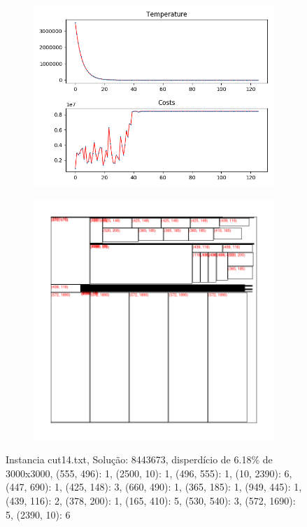 \begin{figure}
\centering
\begin{subfigure}{.5\textwidth}
  \centering
  \includegraphics[width=1\linewidth]{results/cut14/2/plot}
  \label{fig:sub1}
\end{subfigure}%
\begin{subfigure}{.5\textwidth}
  \centering
  \includegraphics[width=1\linewidth]{results/cut14/2/cut}
  \label{fig:sub2}
\end{subfigure}
\caption{Instancia cut14.txt, Solução: 8443673, disperdício de 6.18\% de 3000x3000, {(555, 496): 1, (2500, 10): 1, (496, 555): 1, (10, 2390): 6, (447, 690): 1, (425, 148): 3, (660, 490): 1, (365, 185): 1, (949, 445): 1, (439, 116): 2, (378, 200): 1, (165, 410): 5, (530, 540): 3, (572, 1690): 5, (2390, 10): 6}}
\label{fig:test}
\end{figure}


